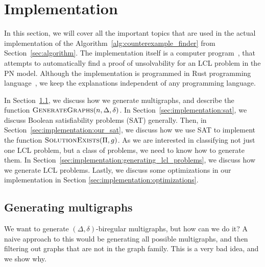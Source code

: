 
\section{Implementation} \label{sec:implementation}
In this section, we will cover all the important topics that are used in the actual implementation of the Algorithm~\ref{alg:counterexample_finder} from Section~\ref{sec:algorithm}.
The implementation itself is a computer program~\cite{NonconstantLclClassifier2022}, that attempts to automatically find a proof of unsolvability for an LCL problem in the PN model.
Although the implementation is programmed in Rust programming language~\cite{RustLang}, we keep the explanations independent of any programming language.

In Section~\ref{sec:implementation:generating_multigraphs}, we discuss how we generate multigraphs, and describe the function $\textsc{GenerateGraphs}(n, \Delta, \delta)$.
In Section~\ref{sec:implementation:sat}, we discuss Boolean satisfiability problems (SAT) generally.
Then, in Section~\ref{sec:implementation:our_sat}, we discuss how we use SAT to implement the function $\textsc{SolutionExists}(\Pi, g)$.
As we are interested in classifying not just one LCL problem, but a class of problems, we need to know how to generate them.
In Section~\ref{sec:implementation:generating_lcl_problems}, we discuss how we generate LCL problems.
Lastly, we discuss some optimizations in our implementation in Section \ref{sec:implementation:optimizations}.


\subsection{Generating multigraphs} \label{sec:implementation:generating_multigraphs}
We want to generate $(\Delta, \delta)$-biregular multigraphs, but how can we do it?
A naive approach to this would be generating all possible multigraphs, and then filtering out graphs that are not in the graph family.
This is a very bad idea, and we show why.

